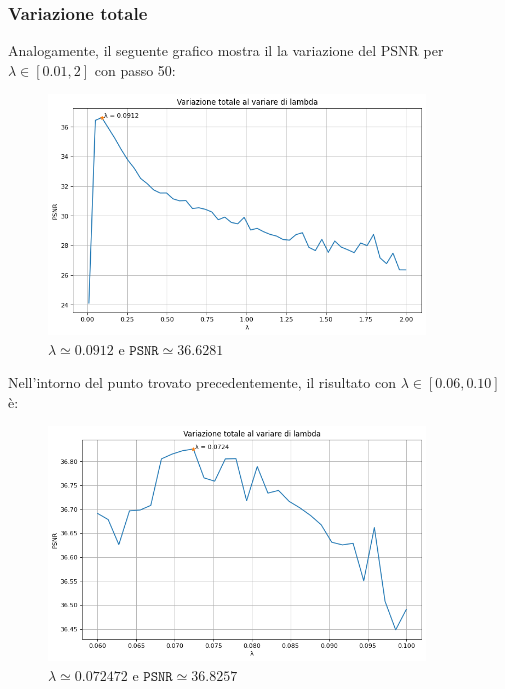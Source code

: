 \documentclass[11pt]{article}
\begin{document}
\subsubsection*{Variazione totale}
Analogamente, il seguente grafico mostra il la variazione del PSNR per $\lambda \in [0.01, 2]$ con passo 50:
\begin{figure}[H]
    \centering
    \includegraphics[width=10cm]{tv_lambda1.png}
    \caption{$\lambda \simeq 0.0912$ e $\texttt{PSNR} \simeq 36.6281$}
    \label{fig:tv_lambda1}
\end{figure}
Nell'intorno del punto trovato precedentemente, il risultato con $\lambda \in [0.06, 0.10]$ è:
\begin{figure}[H]
    \centering
    \includegraphics[width=10cm]{tv_lambda2.png}
    \caption{$\lambda \simeq 0.072472$ e $\texttt{PSNR} \simeq 36.8257$}
    \label{fig:tv_lambda2}
\end{figure}
\end{document}
